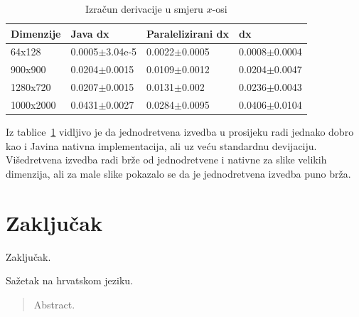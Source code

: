 \documentclass[times, utf8, zavrsni]{fer}
\begin{document}
\begin{table}[htb]
	\centering
	\caption{Izračun derivacije u smjeru \(x\)-osi}
	\label{tbl:dx}
	\begin{tabular}{llll} \hline
		Dimenzije & Java dx & Paralelizirani dx & dx\\ \hline
		64x128 & 0.0005$\pm$3.04e-5 & 0.0022$\pm$0.0005 & 0.0008$\pm$0.0004\\
		900x900 & 0.0204$\pm$0.0015 & 0.0109$\pm$0.0012 & 0.0204$\pm$0.0047\\
		1280x720 & 0.0207$\pm$0.0015 & 0.0131$\pm$0.002 & 0.0236$\pm$0.0043\\
		1000x2000 & 0.0431$\pm$0.0027 & 0.0284$\pm$0.0095 & 0.0406$\pm$0.0104\\ \hline
	\end{tabular}
\end{table}

Iz tablice~\ref{tbl:dx} vidljivo je da jednodretvena izvedba u prosijeku radi jednako dobro kao i Javina nativna implementacija, ali uz veću standardnu devijaciju. Višedretvena izvedba radi brže od jednodretvene i nativne za slike velikih dimenzija, ali za male slike pokazalo se da je jednodretvena izvedba puno brža.

\chapter{Zaključak}
Zaključak.




\begin{sazetak}
Sažetak na hrvatskom jeziku.

\end{sazetak}

\begin{abstract}
Abstract.

\end{abstract}
\end{document}
